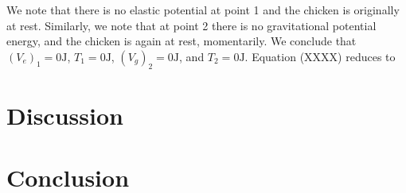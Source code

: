 \documentclass[a4paper]{article}
\begin{document}
We note that there is no elastic potential at point 1 and the chicken is originally at rest. Similarly, we note that at point 2 there is no gravitational potential energy, and the chicken is again at rest, momentarily. We conclude that $(V_e)_1 = 0 \si{\joule}$, $T_1 = 0 \si{\joule}$, $(V_g)_2 = 0\si{\joule}$, and $T_2 = 0 \si{\joule}$. Equation (XXXX) reduces to

\section{Discussion}

\section{Conclusion}



\end{document}
